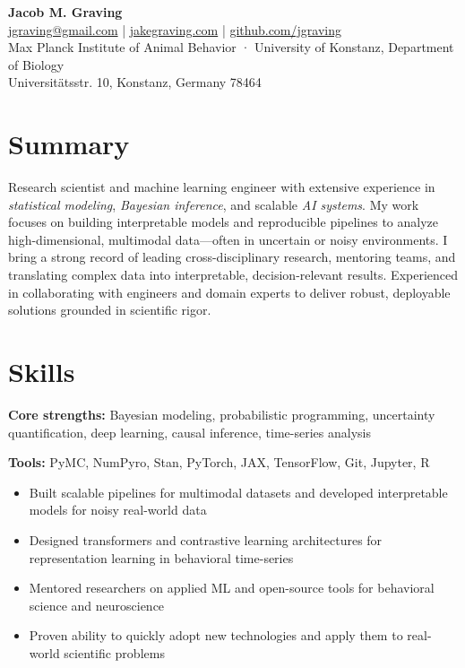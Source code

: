 \documentclass[10pt,a4paper]{article}
\begin{document}
	
\begin{center}
	{\huge \textbf{Jacob M. Graving}}\\[6pt]
	\href{mailto:jgraving@gmail.com}{jgraving@gmail.com}
	\quad | \quad
	\href{http://jakegraving.com/}{jakegraving.com}
	\quad | \quad
	\href{https://github.com/jgraving}{github.com/jgraving}\\[8pt]
	
	{\small
		Max Planck Institute of Animal Behavior \quad · \quad
		University of Konstanz, Department of Biology \\
		Universit\"{a}tsstr. 10, Konstanz, Germany 78464
	}
\end{center}

\section*{Summary}
Research scientist and machine learning engineer with extensive experience in \textit{statistical modeling}, \textit{Bayesian inference}, and scalable \textit{AI systems}. My work focuses on building interpretable models and reproducible pipelines to analyze high-dimensional, multimodal data—often in uncertain or noisy environments. I bring a strong record of leading cross-disciplinary research, mentoring teams, and translating complex data into interpretable, decision-relevant results. Experienced in collaborating with engineers and domain experts to deliver robust, deployable solutions grounded in scientific rigor.

\section*{Skills}
\textbf{Core strengths:} Bayesian modeling, probabilistic programming, uncertainty quantification, deep learning, causal inference, time-series analysis

\textbf{Tools:} PyMC, NumPyro, Stan, PyTorch, JAX, TensorFlow, Git, Jupyter, R

\begin{itemize}
	\item Built scalable pipelines for multimodal datasets and developed interpretable models for noisy real-world data
	\item Designed transformers and contrastive learning architectures for representation learning in behavioral time-series
	\item Mentored researchers on applied ML and open-source tools for behavioral science and neuroscience
	\item Proven ability to quickly adopt new technologies and apply them to real-world scientific problems
\end{itemize}
\end{document}
